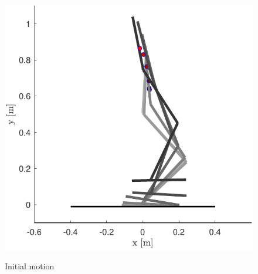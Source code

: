 \documentclass[letterpaper, 10 pt, conference]{ieeeconf}  %
\begin{document}
\begin{figure}[b]
	\centering
	{\includegraphics[scale=0.5]{initialguess}
	}%
	\caption{Initial motion} \label{fig:seq}	
\end{figure}


\end{document}
